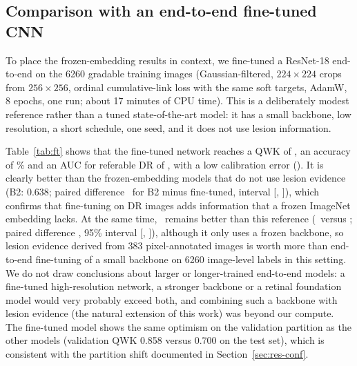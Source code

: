 \subsection{Comparison with an end-to-end fine-tuned CNN}
\label{sec:res-ft}
To place the frozen-embedding results in context, we fine-tuned a ResNet-18 end-to-end on the 6260 gradable training images (Gaussian-filtered, $224\times224$ crops from $256\times256$, ordinal cumulative-link loss with the same soft targets, AdamW, 8 epochs, one run; about 17 minutes of CPU time). This is a deliberately modest reference rather than a tuned state-of-the-art model: it has a small backbone, low resolution, a short schedule, one seed, and it does not use lesion information.

Table~\ref{tab:ft} shows that the fine-tuned network reaches a QWK of \nFTQWK, an accuracy of \nFTAcc\% and an AUC for referable DR of \nFTAUC, with a low calibration error (\nFTECE). It is clearly better than the frozen-embedding models that do not use lesion evidence (B2: 0.638; paired difference \nFTdBtwoMean\ for B2 minus fine-tuned, interval [\nFTdBtwoLo, \nFTdBtwoHi]), which confirms that fine-tuning on DR images adds information that a frozen ImageNet embedding lacks. At the same time, \mname\ remains better than this reference (\nMainQWK\ versus \nFTQWK; paired difference \nFTdMainMean, 95\% interval [\nFTdMainLo, \nFTdMainHi]), although it only uses a frozen backbone, so lesion evidence derived from 383 pixel-annotated images is worth more than end-to-end fine-tuning of a small backbone on 6260 image-level labels in this setting. We do not draw conclusions about larger or longer-trained end-to-end models: a fine-tuned high-resolution network, a stronger backbone or a retinal foundation model would very probably exceed both, and combining such a backbone with lesion evidence (the natural extension of this work) was beyond our compute. The fine-tuned model shows the same optimism on the validation partition as the other models (validation QWK 0.858 versus 0.700 on the test set), which is consistent with the partition shift documented in Section~\ref{sec:res-conf}.


